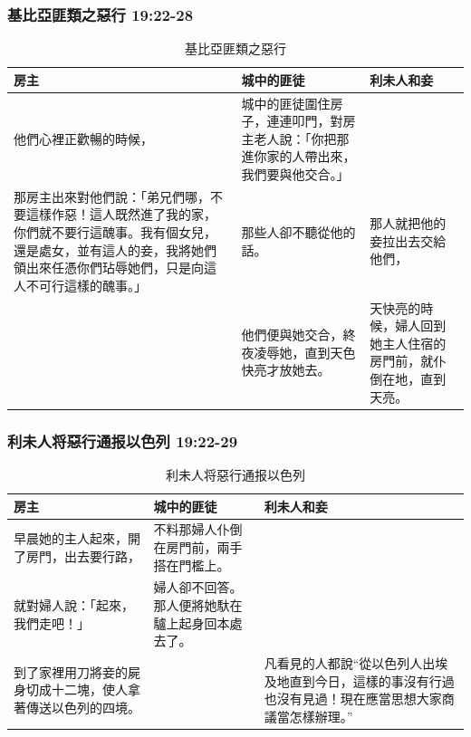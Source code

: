 \subsubsection{基比亞匪類之惡行 19:22-28}
\begin{table}[H]
\centering
\begin{tabular}{p{6.5cm}|p{}|p{5.5cm}}\hline
房主&城中的匪徒&利未人和妾\\\hline
他們心裡正歡暢的時候，
&城中的匪徒圍住房子，連連叩門，對房主老人說：「你把那進你家的人帶出來，我們要與他交合。」&\\\hline
那房主出來對他們說：「弟兄們哪，不要這樣作惡！這人既然進了我的家，你們就不要行這醜事。我有個女兒，還是處女，並有這人的妾，我將她們領出來任憑你們玷辱她們，只是向這人不可行這樣的醜事。」&那些人卻不聽從他的話。&那人就把他的妾拉出去交給他們，\\\hline
&他們便與她交合，終夜凌辱她，直到天色快亮才放她去。 &天快亮的時候，婦人回到她主人住宿的房門前，就仆倒在地，直到天亮。\\\hline
\end{tabular}
\caption{基比亞匪類之惡行 }
\end{table}  

\subsubsection{利未人将惡行通报以色列 19:22-29}
\begin{table}[H]
\centering
\begin{tabular}{p{3.6cm}|p{4.5cm}|p{8.5cm}}\hline
房主&城中的匪徒&利未人和妾\\\hline
早晨她的主人起來，開了房門，出去要行路，
&不料那婦人仆倒在房門前，兩手搭在門檻上。&\\\hline
就對婦人說：「起來，我們走吧！」&婦人卻不回答。那人便將她馱在驢上起身回本處去了。&\\\hline
到了家裡用刀將妾的屍身切成十二塊，使人拿著傳送以色列的四境。& &凡看見的人都說“從以色列人出埃及地直到今日，這樣的事沒有行過也沒有見過！現在應當思想大家商議當怎樣辦理。”\\\hline
\end{tabular}
\caption{利未人将惡行通报以色列}
\end{table}  



